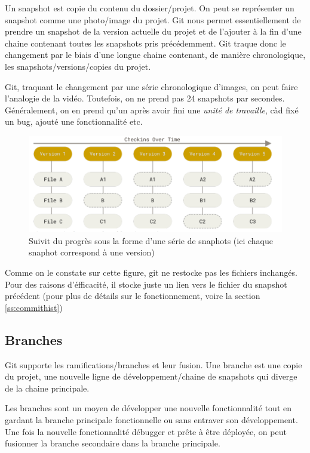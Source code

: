 \documentclass[a4paper, 12pt]{article}
\begin{document}
    Un snapshot est copie du contenu du dossier/projet. On peut se représenter
    un snapshot comme une photo/image du projet. Git nous permet essentiellement
    de prendre un snapshot de la version actuelle du projet et de l'ajouter à
    la fin d'une chaine contenant toutes les snapshots pris précédemment. Git
    traque donc le changement par le biais d'une longue chaine contenant, de
    manière chronologique, les snapshots/versions/copies du projet.

    Git, traquant le changement par une série chronologique d'images, on peut
    faire l'analogie de la vidéo.  Toutefois, on ne prend pas 24 snapshots par
    secondes. Généralement, on en prend qu'un après avoir fini une \textit{unité
    de travaille}, càd fixé un bug, ajouté une fonctionnalité etc.

    \begin{figure}[H]
        \centering
        \includegraphics[scale=0.54]{figs/snapshot_based_cvs.png}
        \caption{Suivit du progrès sous la forme d'une série de snaphots (ici
        chaque snaphot correspond à une version)}
        \label{fig:graphcommit}
    \end{figure}

    Comme on le constate  sur cette figure, git ne restocke pas les fichiers
    inchangés. Pour des raisons d'éfficacité, il stocke juste un lien vers le
    fichier du snapshot précédent (pour plus de détails sur le fonctionnement,
    voire la section \ref{ss:commithist})

    \subsection{Branches}
    
    Git supporte les ramifications/branches et leur fusion. Une branche est
    une copie du projet, une nouvelle ligne de développement/chaine de
    snapshots qui diverge de la chaine principale. 

    Les branches sont un moyen de développer une nouvelle fonctionnalité tout en
    gardant la branche principale fonctionnelle ou sans entraver son
    développement. Une fois la nouvelle fonctionnalité débugger et prête à être
    déployée, on peut fusionner la branche secondaire dans la branche
    principale.
\end{document}
